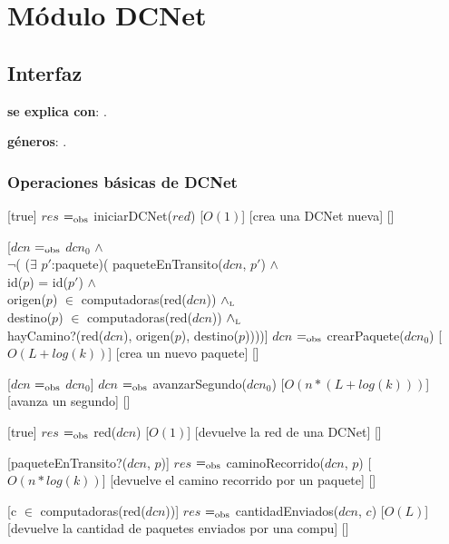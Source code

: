 \section{Módulo DCNet}

\subsection{Interfaz}

\textbf{se explica con}: .

\textbf{géneros}: .

\subsubsection{Operaciones básicas de DCNet}

[true]
{$res$ $=_{\mathrm{obs}}$ iniciarDCNet($red$)}
[$O(1)$]
[crea una DCNet nueva]
[]
~

[$dcn$ $=_{\mathrm{obs}}$ $dcn_0$ $\land$ \\
$\neg$( ($\exists$ $p'$:paquete)(	paqueteEnTransito($dcn$, $p'$) $\land$ \\
									id($p$) = id($p'$) $\land$ \\
									origen($p$) $\in$ computadoras(red($dcn$)) $\land_{\mathrm{\scriptscriptstyle{L}}}$ \\
									destino($p$) $\in$ computadoras(red($dcn$)) $\land_{\mathrm{\scriptscriptstyle{L}}}$ \\
									hayCamino?(red($dcn$), origen($p$), destino($p$))))]
{$dcn$ $=_{\mathrm{obs}}$ crearPaquete($dcn_0$)}
[$O(L + log(k))$]
[crea un nuevo paquete]
[]
~

[$dcn$ $=_{\mathrm{obs}}$ $dcn_0$]
{$dcn$ $=_{\mathrm{obs}}$ avanzarSegundo($dcn_0$)}
[$O(n * (L + log(k)))$]
[avanza un segundo]
[]
~

[true]
{$res$ $=_{\mathrm{obs}}$ red($dcn$)}
[$O(1)$]
[devuelve la red de una DCNet]
[]
~

[paqueteEnTransito?($dcn$, $p$)]
{$res$ $=_{\mathrm{obs}}$ caminoRecorrido($dcn$, $p$)}
[$O(n * log(k))$]
[devuelve el camino recorrido por un paquete]
[]
~

[c $\in$ computadoras(red($dcn$))]
{$res$ $=_{\mathrm{obs}}$ cantidadEnviados($dcn$, $c$)}
[$O(L)$]
[devuelve la cantidad de paquetes enviados por una compu]
[]
~

